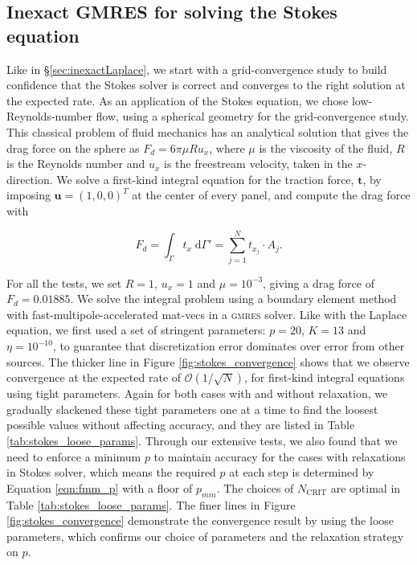 \documentclass[smallcondensed,final]{svjour3}
\renewcommand{\O}[1]{\mathcal{O}(#1)}
\newcommand{\ncrit}{N_{\text{CRIT}}}
\newcommand{\gmres}{\textsc{gmres}\xspace}
\newcommand{\di}[1]{\text{d}#1}
\newcommand{\vect}[1]{\mathbf{#1}}
\begin{document}
\subsection{Inexact {\small GMRES} for solving the Stokes equation}
Like in \S\ref{sec:inexactLaplace}, we start with a grid-convergence study to build confidence that the Stokes solver is correct and converges to the right solution at the expected rate. As an application of the Stokes equation, we chose low-Reynolds-number flow, using a spherical geometry for the grid-convergence study. This classical problem of fluid mechanics has an analytical solution that gives the drag force on the sphere as $F_d = 6\pi\mu Ru_x$, where $\mu$ is the viscosity of the fluid, $R$ is the Reynolds number and $u_x$ is the freestream velocity, taken in the $x$-direction. We solve a first-kind integral equation for the traction force, $\vect{t}$, by imposing $\vect{u} = (1,0,0)^{T}$ at the center of every panel, and compute the drag force with

\begin{equation}
	\label{eqn:stokes_traction_drag}
	F_d = \int_\Gamma t_x\;\di{\Gamma'} = \sum_{j=1}^{N} t_{x_j}\cdot A_j.
\end{equation}


For all the tests, we set $R=1$, $u_x = 1$ and $\mu = 10^{-3}$, giving a drag force of $F_d = 0.01885$. We solve the integral problem using a boundary element method with fast-multipole-accelerated mat-vecs in a \gmres solver.
Like with the Laplace equation, we first used a set of stringent parameters: $p=20$, $K=13$ and $\eta=10^{-10}$, to guarantee that discretization error dominates over error from other sources. The thicker line in Figure \ref{fig:stokes_convergence} shows that we observe convergence at the expected rate of $\O{1 / \sqrt{N}}$, for first-kind integral equations using tight parameters. Again for both cases with and without relaxation, we gradually slackened these tight parameters one at a time to find the loosest possible values without affecting accuracy, and they are listed in Table \ref{tab:stokes_loose_params}. Through our extensive tests, we also found that we need to enforce a minimum $p$ to maintain accuracy for the cases with relaxations in Stokes solver, which means the required $p$ at each step is determined by Equation \eqref{eqn:fmm_p} with a floor of $p_{min}$. The choices of $\ncrit$ are optimal in Table \ref{tab:stokes_loose_params}. The finer lines in Figure \ref{fig:stokes_convergence} demonstrate the convergence result by using the loose parameters, which confirms our choice of parameters and the relaxation strategy on $p$.
\end{document}

